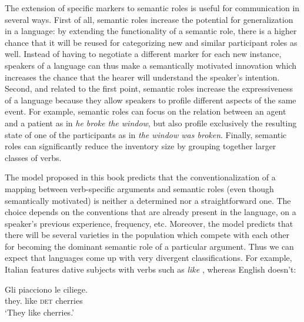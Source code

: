 The extension of specific markers to semantic roles is useful for communication in several ways. First of all, semantic roles increase the potential for generalization in a language: by extending the functionality of a semantic role, there is a higher chance that it will be reused for categorizing new and similar participant roles as well. Instead of having to negotiate a different marker for each new instance, speakers of a language can thus make a semantically motivated innovation which increases the chance that the hearer will understand the speaker's intention. Second, and related to the first point, semantic roles increase the expressiveness of a language because they allow speakers to profile different aspects of the same event. For example, semantic roles can focus on the relation between an agent and a patient as in {\em he broke the window}, but also profile exclusively the resulting state of one of the participants as in {\em the window was broken}. Finally, semantic roles can significantly reduce the inventory size by grouping together larger classes of verbs.

The model proposed in this book predicts that the conventionalization of a mapping between verb-specific arguments and semantic roles (even though semantically motivated) is neither a determined nor a straightforward one. The choice depends on the conventions that are already present in the language, on a speaker's previous experience, frequency, etc. Moreover, the model predicts that there will be several varieties in the population which compete with each other for becoming the dominant semantic role of a particular argument. Thus we can expect that languages come up with very divergent classifications. For example, Italian features dative subjects with verbs such as {\em like} \citep[27]{palmer94grammatical}, whereas English doesn't:

\ea
\gll Gli piacciono le ciliege. \\
they.{\dat} like \textsc{det} cherries \\
\glt `They like cherries.'  \\
\z


